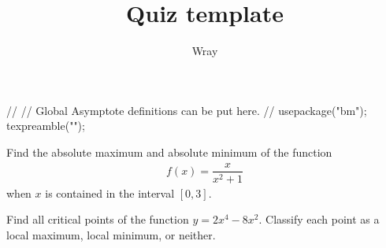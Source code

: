 \documentclass[addpoints, 12pt]{exam}
\title{Quiz template}
\author{Wray}
\begin{document}
\begin{asydef}
//
// Global Asymptote definitions can be put here.
//
usepackage("bm");
texpreamble("\def\V#1{\bm{#1}}");
\end{asydef}



\bigskip

             
\bigskip
\bigskip
\begin{questions}

\question[10]
Find the absolute maximum and absolute minimum of the function 
\begin{align*}
f(x) = \dfrac{x}{x^2 + 1}
\end{align*}
when $x$ is contained in the interval $[0,3]$.

\clearpage

\question[10]
Find all critical points of the function $y = 2x^4 - 8x^2$.  Classify each point as a local maximum, local minimum, or neither.

\end{questions}
\end{document}
